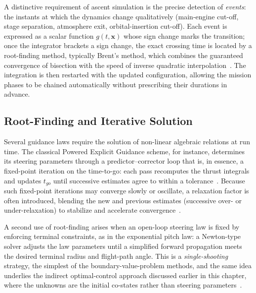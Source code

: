 A distinctive requirement of ascent simulation is the precise detection of \emph{events}: the instants at which the dynamics change qualitatively (main-engine cut-off, stage separation, atmosphere exit, orbital-insertion cut-off). Each event is expressed as a scalar function $g(t,\mathbf{x})$ whose sign change marks the transition; once the integrator brackets a sign change, the exact crossing time is located by a root-finding method, typically Brent's method, which combines the guaranteed convergence of bisection with the speed of inverse quadratic interpolation~\cite{brent1973algorithms}. The integration is then restarted with the updated configuration, allowing the mission phases to be chained automatically without prescribing their durations in advance.


\subsection{Root-Finding and Iterative Solution}
\label{ssec:rootfinding}

Several guidance laws require the solution of non-linear algebraic relations at run time. The classical Powered Explicit Guidance scheme, for instance, determines its steering parameters through a predictor--corrector loop that is, in essence, a fixed-point iteration on the time-to-go: each pass recomputes the thrust integrals and updates $t_{go}$ until successive estimates agree to within a tolerance~\cite{burden2015numerical}. Because such fixed-point iterations may converge slowly or oscillate, a relaxation factor is often introduced, blending the new and previous estimates (successive over- or under-relaxation) to stabilize and accelerate convergence~\cite{burden2015numerical}.

A second use of root-finding arises when an open-loop steering law is fixed by enforcing terminal constraints, as in the exponential pitch law: a Newton-type solver adjusts the law parameters until a simplified forward propagation meets the desired terminal radius and flight-path angle. This is a \emph{single-shooting} strategy, the simplest of the boundary-value-problem methods, and the same idea underlies the indirect optimal-control approach discussed earlier in this chapter, where the unknowns are the initial co-states rather than steering parameters~\cite{BettsSurvey1998}.


